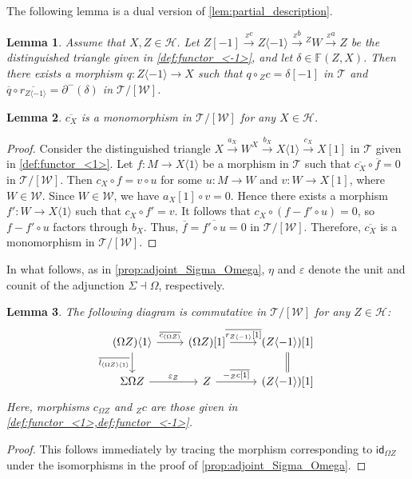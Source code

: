 \documentclass[a4paper,reqno,10pt]{amsart}
\newtheorem{lemma}[lemma]{Lemma}
\theoremstyle{definition}
\theoremstyle{definition}
\theoremstyle{definition}
\theoremstyle{definition}
\theoremstyle{plain}
\newcommand{\id}{\mathsf{id}}
\newcommand{\ovl}[1]{\overline{#1}}
\newcommand{\BF}{\mathbb{F}}
\newcommand{\CH}{\mathcal{H}}
\newcommand{\CT}{\mathcal{T}}
\newcommand{\CW}{\mathcal{W}}
\newcommand{\Ar}[3]{\ar[from=#1,to=#2,#3]}
\begin{document}
The following lemma is a dual version of \cref{lem:partial_description}.

\begin{lemma}
\label{lem:partial_description_dual}
Assume that $X,Z\in\CH$. 
Let $Z[-1]\xrightarrow{{}_Zc}Z\langle -1\rangle\xrightarrow{{}_Zb} {}^ZW\xrightarrow{{}_Za} Z$ be the distinguished triangle given in \cref{def:functor_<-1>}, and let $\delta\in \BF(Z,X)$.
Then there exists a morphism $q\colon Z\langle -1\rangle\to X$ such that $q\circ {}_Zc=\delta[-1]$ in $\CT$ and $\ovl{q}\circ\ovl{r_{Z\langle -1\rangle}}=\partial^-(\delta)$ in $\CT/[\CW]$.
\end{lemma}

\begin{lemma}
\label{lem:c_X_monomorphism}
$\ovl{c_X}$ is a monomorphism in $\CT/[\CW]$ for any $X\in\CH$.
\end{lemma}
\begin{proof}
Consider the distinguished triangle $X\xrightarrow{a_X} W^X\xrightarrow{b_X} X\langle 1\rangle\xrightarrow{c_X} X[1]$ in $\CT$ given in \cref{def:functor_<1>}. Let $f\colon M\to X\langle 1\rangle$ be a morphism in $\CT$ such that $\ovl{c_X}\circ\ovl{f}=0$ in $\CT/[\CW]$. Then $c_X\circ f=v\circ u$ for some $u\colon M\to W$ and $v\colon W\to X[1]$, where $W\in\CW$. Since $W\in\CW$, we have $a_X[1]\circ v=0$. Hence there exists a morphism $f'\colon W\to X\langle 1\rangle$ such that $c_X\circ f'=v$. It follows that $c_X\circ(f-f'\circ u)=0$, so $f-f'\circ u$ factors through $b_X$. Thus, $\ovl{f}=\ovl{f'\circ u}=0$ in $\CT/[\CW]$. Therefore, $\ovl{c_X}$ is a monomorphism in $\CT/[\CW]$.
\end{proof}

In what follows, as in \cref{prop:adjoint_Sigma_Omega}, $\eta$ and
$\varepsilon$ denote the unit and counit of the adjunction
$\Sigma\dashv\Omega$, respectively.
\begin{lemma}
\label{lem:equation_counit}
The following diagram is commutative in $\CT/[\CW]$ for any $Z\in \CH$:
$$
\begin{tikzcd}
(\Omega Z)\langle 1\rangle & (\Omega Z)[1] & (Z\langle -1\rangle)[1] \\
\Sigma\Omega Z & Z & (Z\langle -1\rangle)[1]
\Ar{1-1}{1-2}{"\ovl{c_{(\Omega Z)}}"}
\Ar{1-2}{1-3}{"\ovl{r_{Z\langle -1\rangle}[1]}"}
\Ar{2-1}{2-2}{"\varepsilon_Z"}
\Ar{2-2}{2-3}{"{-\ovl{{}_Zc[1]}}"}
\Ar{1-1}{2-1}{"\ovl{l_{(\Omega Z)\langle 1\rangle}}"'}
\Ar{1-3}{2-3}{equal}
\end{tikzcd}
$$
Here, morphisms $c_{\Omega Z}$ and ${}_Zc$ are those given in \cref{def:functor_<1>,def:functor_<-1>}.
\end{lemma}
\begin{proof}
This follows immediately by tracing the morphism corresponding to $\id_{\Omega Z}$ under the isomorphisms in the proof of \cref{prop:adjoint_Sigma_Omega}.
\end{proof}
\end{document}
